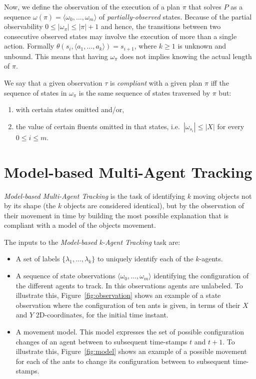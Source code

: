 \documentclass[letterpaper]{article} %
\newcommand{\tup}[1]{{\langle #1 \rangle}}
\begin{document}
Now, we define the observation of the execution of a plan $\pi$ that solves $P$ as a sequence $\omega(\pi)=\tup{\omega_0, \ldots, \omega_m}$ of {\em partially-observed} states. Because of the partial observability $0\leq |\omega_\pi|\leq |\pi|+1$ and hence, the transitions between two consecutive observed states may involve the execution of more than a single action. Formally $\theta(s_i,\tup{a_1,\ldots,a_k})=s_{i+1}$, where $k\geq 1$ is unknown and unbound. This means that having $\omega_\pi$ does not implies knowing the actual length of $\pi$.

We say that a given observation $\tau$ is {\em compliant} with a given plan $\pi$ iff the sequence of states in $\omega_\pi$ is the same sequence of states traversed by $\pi$ but:
\begin{enumerate}
\item with certain states omitted and/or,
\item the value of certain fluents omitted in that states, i.e.~$|\omega_{s_i}|\leq |X|$ for every $0\leq i\leq m$.
\end{enumerate}

\section{Model-based Multi-Agent Tracking}
\label{sec:tracking}

{\em Model-based Multi-Agent Tracking} is the task of identifying $k$ moving objects not by its shape (the $k$ objects are considered identical), but by the observation of their movement in time by building the most possible explanation that is compliant with a model of the objects movement.

The inputs to the {\em Model-based k-Agent Tracking} task are:
\begin{itemize}
\item A set of labels $\{\lambda_1,\ldots,\lambda_k\}$ to uniquely identify each of the $k$-agents.
\item A sequence of state observations $\tup{\omega_0, \ldots, \omega_m}$ identifying the configuration of the different agents to track. In this observations agents are unlabeled. To illustrate this, Figure~\ref{fig:observation} shows an example of a state observation where the configuration of ten ants is given, in terms of their $X$ and $Y$ 2D-coordinates, for the initial time instant.
\item A movement model. This model expresses the set of possible configuration changes of an agent between to subsequent time-stamps $t$ and $t+1$. To illustrate this, Figure~\ref{fig:model} shows an example of a possible movement for each of the ants to change its configuration between to subsequent time-stamps.
\end{itemize}
\end{document}
